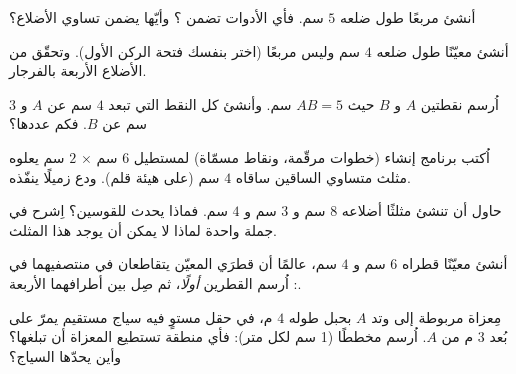 \begin{exercise}[$\star$]\label{exo:g5:geometry:5}
أنشئ مربعًا طول ضلعه $5$ سم. فأي الأدوات تضمن ؟ وأيّها يضمن تساوي الأضلاع؟
\end{exercise}

\begin{exercise}[$\star$]\label{exo:g5:geometry:6}
أنشئ معيّنًا طول ضلعه $4$ سم وليس مربعًا (اختر بنفسك
فتحة الركن الأول). وتحقّق من الأضلاع الأربعة بالفرجار.
\end{exercise}

\begin{exercise}[$\star$]\label{exo:g5:geometry:7}
اُرسم نقطتين $A$ و $B$ حيث $AB = 5$ سم. وأنشئ كل النقط
التي تبعد $4$ سم عن $A$ و $3$ سم عن $B$. فكم عددها؟
\end{exercise}

\begin{exercise}[$\star$]\label{exo:g5:geometry:8}
اُكتب برنامج إنشاء (خطوات مرقّمة، ونقاط مسمّاة) لمستطيل
$6$ سم $\times$ $2$ سم يعلوه مثلث متساوي الساقين
ساقاه $4$ سم (على هيئة قلم). ودع زميلًا ينفّذه.
\end{exercise}

\begin{exercise}[$\star\star$]\label{exo:g5:geometry:9}
حاول أن تنشئ مثلثًا أضلاعه $8$ سم و $3$ سم و $4$ سم.
فماذا يحدث للقوسين؟ اِشرح في جملة واحدة لماذا لا يمكن أن
يوجد هذا المثلث.
\end{exercise}

\begin{exercise}[$\star\star$]\label{exo:g5:geometry:10}
أنشئ معيّنًا قطراه $6$ سم و $4$ سم،
عالمًا أن قطرَي المعيّن يتقاطعان في منتصفيهما في
: اُرسم القطرين \emph{أولًا}، ثم صِل بين أطرافهما
الأربعة.
\end{exercise}

\begin{exercise}[$\star\star$]\label{exo:g5:geometry:11}
مِعزاة مربوطة إلى وتد $A$ بحبل طوله $4$ م، في حقل مستوٍ فيه
سياج مستقيم يمرّ على بُعد $3$ م من $A$. اُرسم مخططًا (1 سم لكل
متر): فأي منطقة تستطيع المعزاة أن تبلغها؟ وأين يحدّها
السياج؟
\end{exercise}
